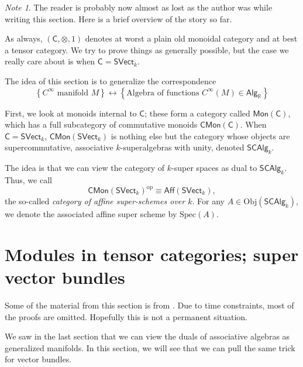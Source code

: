 \documentclass[a4paper]{report}
\newcommand{\R}{\mathbb{R}}
\newcommand{\Obj}{\mathrm{Obj}}
\newcommand{\Spec}{\mathrm{Spec}}
\theoremstyle{definition}
\theoremstyle{plain}
\theoremstyle{remark}
\newtheorem{note}{Note}[section]
\begin{document}
\begin{note}
  The reader is probably now almost as lost as the author was while writing this section. Here is a brief overview of the story so far.

  As always, $(\mathsf{C}, \otimes, 1)$ denotes at worst a plain old monoidal category and at best a tensor category. We try to prove things as generally possible, but the case we really care about is when $\mathsf{C} = \mathsf{SVect}_{k}$.

  The idea of this section is to generalize the correspondence 
  \begin{equation*}
    \left\{ \text{$C^{\infty}$ manifold $M$} \right\} \longleftrightarrow \left\{ \text{Algebra of functions $C^{\infty}(M) \in \mathsf{Alg}_{\R}$} \right\}
  \end{equation*}

  First, we look at monoids internal to $\mathsf{C}$; these form a category called $\mathsf{Mon}(\mathsf{C})$, which has a full subcategory of commutative monoids $\mathsf{CMon}(\mathsf{C})$. When $\mathsf{C} = \mathsf{SVect}_{k}$, $\mathsf{CMon}(\mathsf{SVect}_{k})$ is nothing else but the category whose objects are supercommutative, associative $k$-superalgebras with unity, denoted $\mathsf{SCAlg}_{k}$.

  The idea is that we can view the category of $k$-super spaces as dual to $\mathsf{SCAlg}_{k}$. Thus, we call 
  \begin{equation*}
    \mathsf{CMon}(\mathsf{SVect}_{k})^{\mathrm{op}} \equiv \mathsf{Aff}(\mathsf{SVect}_{k}),
  \end{equation*}
  the so-called \emph{category of affine super-schemes over $k$}. For any $A \in \Obj(\mathsf{SCAlg}_{k})$, we denote the associated affine super scheme by $\Spec(A)$.
\end{note}

\section{Modules in tensor categories; super vector bundles}
Some of the material from this section is from \cite{nestruev-smooth-manifolds-observables}. Due to time constraints, most of the proofs are omitted. Hopefully this is not a permanent situation.

We saw in the last section that we can view the duals of associative algebras as generalized manifolds. In this section, we will see that we can pull the same trick for vector bundles.
\end{document}
